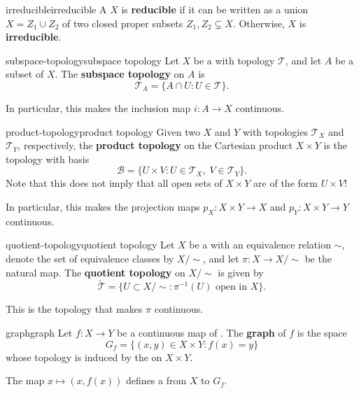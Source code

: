 \begin{topic}{irreducible}{irreducible}
    A  $X$ is \textbf{reducible} if it can be written as a union $X = Z_1 \cup Z_2$ of two closed proper subsets $Z_1, Z_2 \subsetneq X$. Otherwise, $X$ is \textbf{irreducible}.
\end{topic}

\begin{topic}{subspace-topology}{subspace topology}
    Let $X$ be a  with topology $\mathcal{T}$, and let $A$ be a subset of $X$. The \textbf{subspace topology} on $A$ is
    \[ \mathcal{T}_A = \{ A \cap U : U \in \mathcal{T} \} . \]
    
    In particular, this makes the inclusion map $i : A \to X$ continuous.
\end{topic}

\begin{topic}{product-topology}{product topology}
    Given two  $X$ and $Y$ with topologies $\mathcal{T}_X$ and $\mathcal{T}_Y$, respectively, the \textbf{product topology} on the Cartesian product $X \times Y$ is the topology with basis
    \[ \mathcal{B} = \{ U \times V : U \in \mathcal{T}_X, \; V \in \mathcal{T}_Y \} . \]
    Note that this does not imply that all open sets of $X \times Y$ are of the form $U \times V$!
    
    In particular, this makes the projection maps $p_X : X \times Y \to X$ and $p_Y : X \times Y \to Y$ continuous.
\end{topic}

\begin{topic}{quotient-topology}{quotient topology}
    Let $X$ be a  with an equivalence relation $\sim{}$, denote the set of equivalence classes by $X / \sim{}$, and let $\pi : X \to X / \sim{}$ be the natural map. The \textbf{quotient topology} on $X / \sim{}$ is given by
    \[ \tilde{\mathcal{T}} = \{ U \subset X / \sim{} : \pi^{-1}(U) \text{ open in } X \} . \]
    
    This is the  topology that makes $\pi$ continuous.
\end{topic}

\begin{topic}{graph}{graph}
    Let $f : X \to Y$ be a continuous map of . The \textbf{graph} of $f$ is the space
    \[ G_f = \{ (x, y) \in X \times Y : f(x) = y \} \]
    whose topology is induced by the  on $X \times Y$.
    
    The map $x \mapsto (x, f(x))$ defines a  from $X$ to $G_f$.
\end{topic}


